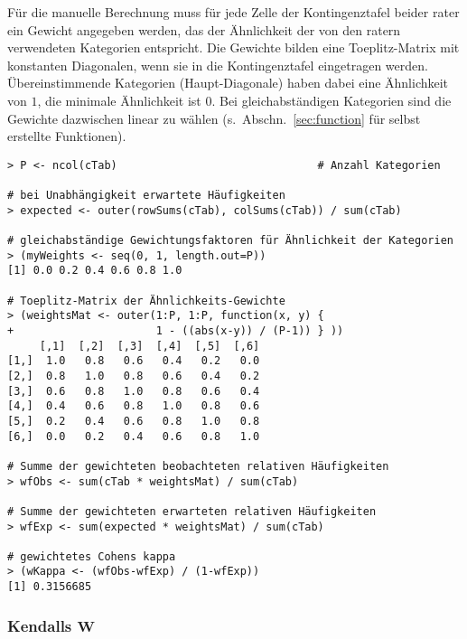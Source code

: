 Für die manuelle Berechnung muss für jede Zelle der Kontingenztafel beider rater ein Gewicht angegeben werden, das der Ähnlichkeit der von den ratern verwendeten Kategorien entspricht. Die Gewichte bilden eine Toeplitz-Matrix mit konstanten Diagonalen, wenn sie in die Kontingenztafel eingetragen werden. Übereinstimmende Kategorien (Haupt-Diagonale) haben dabei eine Ähnlichkeit von $1$, die minimale Ähnlichkeit ist $0$. Bei gleichabständigen Kategorien sind die Gewichte dazwischen linear zu wählen (s.\ Abschn.\ \ref{sec:function} für selbst erstellte Funktionen).
\begin{lstlisting}
> P <- ncol(cTab)                               # Anzahl Kategorien

# bei Unabhängigkeit erwartete Häufigkeiten
> expected <- outer(rowSums(cTab), colSums(cTab)) / sum(cTab)

# gleichabständige Gewichtungsfaktoren für Ähnlichkeit der Kategorien
> (myWeights <- seq(0, 1, length.out=P))
[1] 0.0 0.2 0.4 0.6 0.8 1.0

# Toeplitz-Matrix der Ähnlichkeits-Gewichte
> (weightsMat <- outer(1:P, 1:P, function(x, y) {
+                      1 - ((abs(x-y)) / (P-1)) } ))
     [,1]  [,2]  [,3]  [,4]  [,5]  [,6]
[1,]  1.0   0.8   0.6   0.4   0.2   0.0
[2,]  0.8   1.0   0.8   0.6   0.4   0.2
[3,]  0.6   0.8   1.0   0.8   0.6   0.4
[4,]  0.4   0.6   0.8   1.0   0.8   0.6
[5,]  0.2   0.4   0.6   0.8   1.0   0.8
[6,]  0.0   0.2   0.4   0.6   0.8   1.0

# Summe der gewichteten beobachteten relativen Häufigkeiten
> wfObs <- sum(cTab * weightsMat) / sum(cTab)

# Summe der gewichteten erwarteten relativen Häufigkeiten
> wfExp <- sum(expected * weightsMat) / sum(cTab)

# gewichtetes Cohens kappa
> (wKappa <- (wfObs-wfExp) / (1-wfExp))
[1] 0.3156685
\end{lstlisting}

\subsubsection[Kendalls \texorpdfstring{$W$}{W}]{Kendalls $\bm{W}$}

